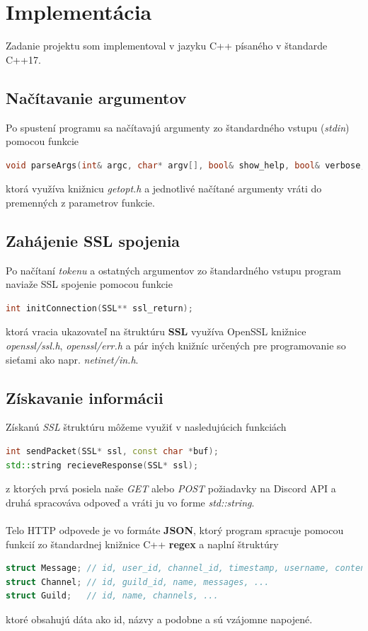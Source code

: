 \documentclass[a4paper,12pt]{article}
\begin{document}
\newpage
\section{Implementácia}
Zadanie projektu som implementoval v jazyku C++ písaného v štandarde C++17. 

\subsection{Načítavanie argumentov}
Po spustení programu sa načítavajú argumenty zo štandardného vstupu (\textit{stdin}) pomocou funkcie
\begin{lstlisting}[language=C++]
void parseArgs(int& argc, char* argv[], bool& show_help, bool& verbose, std::string& token);
\end{lstlisting}
ktorá využíva knižnicu \textit{getopt.h} a jednotlivé načítané argumenty vráti do premenných z parametrov funkcie.

\subsection{Zahájenie SSL spojenia}
Po načítaní \textit{tokenu} a ostatných argumentov zo štandardného vstupu program naviaže SSL spojenie pomocou funkcie 
\begin{lstlisting}[language=C++]
int initConnection(SSL** ssl_return);
\end{lstlisting}
ktorá vracia ukazovateľ na štruktúru \textbf{SSL} využíva OpenSSL knižnice \textit{openssl/ssl.h}, \textit{openssl/err.h} a pár iných knižníc určených pre programovanie so sieťami ako napr. \textit{netinet/in.h}.
\cite{stackoverflow}

\subsection{Získavanie informácii}
Získanú \textit{SSL} štruktúru môžeme využiť v nasledujúcich funkciách
\begin{lstlisting}[language=C++]
int sendPacket(SSL* ssl, const char *buf);
std::string recieveResponse(SSL* ssl);
\end{lstlisting}
z ktorých prvá posiela naše \textit{GET} alebo \textit{POST} požiadavky na Discord API a druhá spracováva odpoveď a vráti ju vo forme \textit{std::string}. \cite{stackoverflow}
\\\\
Telo HTTP odpovede je vo formáte \textbf{JSON}, ktorý program spracuje pomocou funkcií zo štandardnej knižnice C++ \textbf{regex} a naplní štruktúry 
\begin{lstlisting}[language=C++]
struct Message; // id, user_id, channel_id, timestamp, username, content, ...
struct Channel; // id, guild_id, name, messages, ...
struct Guild;   // id, name, channels, ...
\end{lstlisting}
ktoré obsahujú dáta ako id, názvy a podobne a sú vzájomne napojené.
\end{document}
